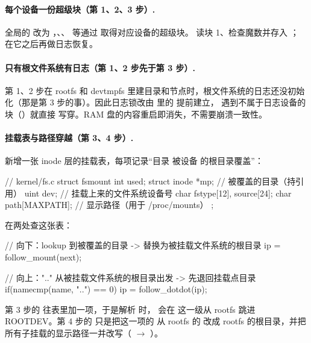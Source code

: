 \paragraph{每个设备一份超级块（第 1、2、3 步）.} 全局的  改为 ，、、 等通过  取得对应设备的超级块。 读块 1、检查魔数并存入 ； 在它之后再做日志恢复。

\paragraph{只有根文件系统有日志（第 1、2 步先于第 3 步）.} 第 1、2 步在 rootfs 和 devtmpfs 里建目录和节点时，根文件系统的日志还没初始化（那是第 3 步的事）。因此日志锁改由  里的  提前建立， 遇到不属于日志设备的块（）就直接  写穿。RAM 盘的内容重启即消失，不需要崩溃一致性。

\paragraph{挂载表与路径穿越（第 3、4 步）.}  新增一张 inode 层的挂载表，每项记录“目录  被设备  的根目录覆盖”：

\begin{ccode}
// kernel/fs.c
struct fsmount {
  int          used;
  struct inode *mp;           // 被覆盖的目录（持引用）
  uint         dev;           // 挂载上来的文件系统设备号
  char         fstype[12], source[24];
  char         path[MAXPATH]; // 显示路径（用于 /proc/mounts）
};
\end{ccode}

 在两处查这张表：

\begin{ccode}
// 向下：lookup 到被覆盖的目录 -> 替换为被挂载文件系统的根目录
ip = follow_mount(next);

// 向上：".." 从被挂载文件系统的根目录出发 -> 先退回挂载点目录
if(namecmp(name, "..") == 0)
    ip = follow_dotdot(ip);
\end{ccode}

第 3 步的  往表里加一项，于是解析  时， 会在  这一级从 rootfs 跳进 ROOTDEV。第 4 步的  只是把这一项的  从 rootfs 的  改成 rootfs 的根目录，并把所有子挂载的显示路径一并改写（ $\to$ ）。

